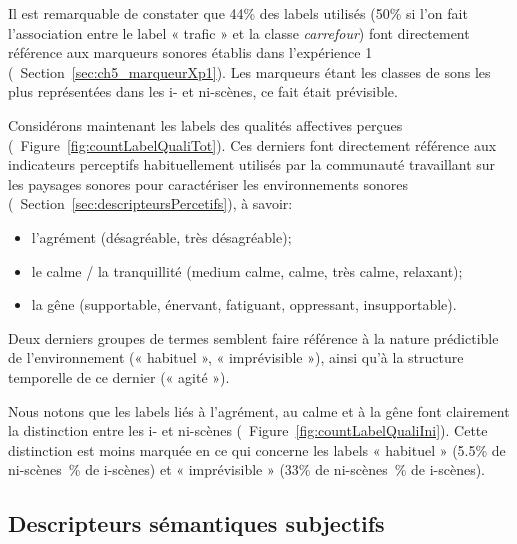  
Il est remarquable de constater que 44\% des labels utilisés (50\% si l'on fait l'association entre le label « trafic » et la classe \emph{carrefour}) font directement référence aux marqueurs sonores établis dans l'expérience 1 (\cf~Section~\ref{sec:ch5_marqueurXp1}). Les marqueurs étant les classes de sons les plus représentées dans les i- et ni-scènes, ce fait était prévisible.

Considérons maintenant les labels des qualités affectives perçues (\cf~Figure~\ref{fig:countLabelQualiTot}). Ces derniers font directement référence aux indicateurs perceptifs habituellement utilisés par la communauté travaillant sur les paysages sonores pour caractériser les environnements sonores (\cf~Section~\ref{sec:descripteursPercetifs}), à savoir:

\begin{itemize}
\item l'agrément (désagréable, très désagréable);
\item le calme / la tranquillité (medium calme, calme, très calme, relaxant);
\item la gêne (supportable, énervant, fatiguant, oppressant, insupportable).
\end{itemize}

Deux derniers groupes de termes semblent faire référence à la nature prédictible de l'environnement (« habituel », « imprévisible »), ainsi qu'à la structure temporelle de ce dernier (« agité »). 

Nous notons que les labels liés à l'agrément, au calme et à la gêne font clairement la distinction entre les i- et ni-scènes (\cf~Figure~\ref{fig:countLabelQualiIni}). Cette distinction est moins marquée en ce qui concerne les labels « habituel » (5.5\% de ni-scènes~\% de i-scènes) et « imprévisible » (33\% de ni-scènes~\% de i-scènes).

\subsection{Descripteurs sémantiques subjectifs}

